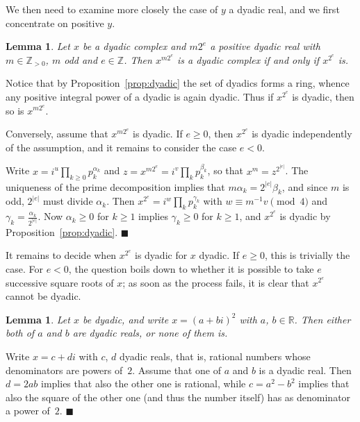 \documentclass {article}
\newcommand {\Z}{\mathbb Z}
\newcommand {\R}{\mathbb R}
\newtheorem{lemma}[theorem]{Lemma}
\newenvironment{proof}{\noindent{\bf Proof:}}{{\hspace* {\fill}$\blacksquare$}}
\begin{document}
We then need to examine more closely the case of $y$ a dyadic real,
and we first concentrate on positive $y$.

\begin{lemma}
\label{lemma1}
Let $x$ be a dyadic complex and $m 2^e$ a positive dyadic real
with $m \in \Z_{>0}$, $m$ odd and $e \in \Z$.
Then $x^{m 2^e}$ is a dyadic complex if and only if $x^{2^e}$ is.
\end{lemma}

\begin{proof}
Notice that by Proposition~\ref {prop:dyadic} the set of dyadics forms
a ring, whence any positive integral power of a dyadic is again dyadic.
Thus if $x^{2^e}$ is dyadic, then so is $x^{m 2^e}$.

Conversely, assume that $x^{m 2^e}$ is dyadic. If $e \geq 0$,
then $x^{2^e}$ is dyadic independently of the assumption,
and it remains to consider the case $e < 0$.

Write $x = i^u \prod_{k \geq 0} p_k^{\alpha_k}$
and $z = x^{m 2^e} = i^v \prod_k p_k^{\beta_k}$, so that $x^m = z^{2^{|e|}}$.
The uniqueness of the prime decomposition implies that
$m \alpha_k = 2^{|e|} \beta_k$, and since $m$ is odd, $2^{|e|}$ must
divide $\alpha_k$. Then
$x^{2^e} = i^w \prod_k p_k^{\gamma_k}$ with $w \equiv m^{-1} v \pmod 4$ and
$\gamma_k = \frac {\alpha_k}{2^{|e|}}$.
Now $\alpha_k \geq 0$ for $k \geq 1$ implies $\gamma_k \geq 0$ for $k \geq 1$,
and $x^{2^e}$ is dyadic by Proposition~\ref {prop:dyadic}.
\end{proof}

It remains to decide when $x^{2^e}$ is dyadic for $x$ dyadic. If $e \geq 0$,
this is trivially the case. For $e < 0$, the question boils down to whether
it is possible to take $e$ successive square roots of $x$; as soon as the
process fails, it is clear that $x^{2^e}$ cannot be dyadic.

\begin{lemma}
Let $x$ be dyadic, and write $x = (a + b i)^2$ with $a$, $b \in \R$.
Then either both of $a$ and $b$ are dyadic reals, or none of them is.
\end{lemma}

\begin{proof}
Write $x = c + d i$ with $c$, $d$ dyadic reals, that is, rational numbers
whose denominators are powers of~$2$. Assume that one of $a$ and
$b$ is a dyadic real. Then $d = 2 a b$ implies that also the other one is
rational, while $c = a^2 - b^2$ implies that also the square of the other
one (and thus the number itself) has as denominator a power of~$2$.
\end{proof}
\end{document}
